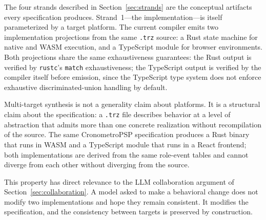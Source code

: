 The four strands described in Section~\ref{sec:strands} are the conceptual
artifacts every specification produces. Strand~1---the implementation---is
itself parameterized by a target platform. The current compiler emits two
implementation projections from the same \texttt{.trz} source: a Rust state
machine for native and WASM execution, and a TypeScript module for browser
environments. Both projections share the same exhaustiveness guarantees: the
Rust output is verified by \texttt{rustc}'s \texttt{match} exhaustiveness; the
TypeScript output is verified by the compiler itself before emission, since the
TypeScript type system does not enforce exhaustive discriminated-union handling
by default.

Multi-target synthesis is not a generality claim about platforms. It is a
structural claim about the specification: a \texttt{.trz} file describes
behavior at a level of abstraction that admits more than one concrete
realization without recompilation of the source. The same CronometroPSP
specification produces a Rust binary that runs in WASM and a TypeScript module
that runs in a React frontend; both implementations are derived from the same
role-event tables and cannot diverge from each other without diverging from the
source.

This property has direct relevance to the LLM collaboration argument of
Section~\ref{sec:collaboration}. A model asked to make a behavioral change does
not modify two implementations and hope they remain consistent. It modifies the
specification, and the consistency between targets is preserved by construction.
